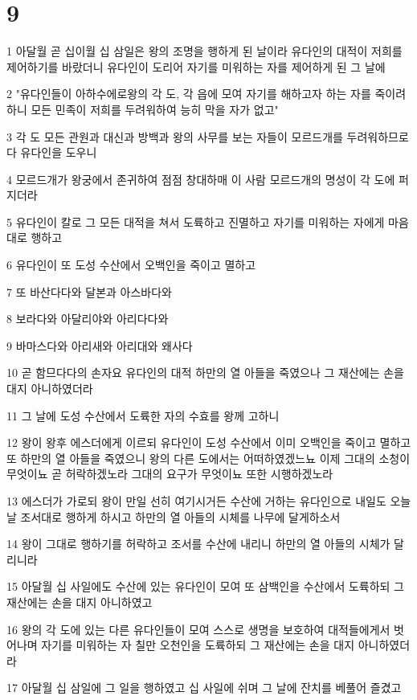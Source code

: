 \chapter{9}

\par 1 아달월 곧 십이월 십 삼일은 왕의 조명을 행하게 된 날이라 유다인의 대적이 저희를 제어하기를 바랐더니 유다인이 도리어 자기를 미워하는 자를 제어하게 된 그 날에
\par 2 "유다인들이 아하수에로왕의 각 도, 각 읍에 모여 자기를 해하고자 하는 자를 죽이려 하니 모든 민족이 저희를 두려워하여 능히 막을 자가 없고"
\par 3 각 도 모든 관원과 대신과 방백과 왕의 사무를 보는 자들이 모르드개를 두려워하므로 다 유다인을 도우니
\par 4 모르드개가 왕궁에서 존귀하여 점점 창대하매 이 사람 모르드개의 명성이 각 도에 퍼지더라
\par 5 유다인이 칼로 그 모든 대적을 쳐서 도륙하고 진멸하고 자기를 미워하는 자에게 마음대로 행하고
\par 6 유다인이 또 도성 수산에서 오백인을 죽이고 멸하고
\par 7 또 바산다다와 달본과 아스바다와
\par 8 보라다와 아달리야와 아리다다와
\par 9 바마스다와 아리새와 아리대와 왜사다
\par 10 곧 함므다다의 손자요 유다인의 대적 하만의 열 아들을 죽였으나 그 재산에는 손을 대지 아니하였더라
\par 11 그 날에 도성 수산에서 도륙한 자의 수효를 왕께 고하니
\par 12 왕이 왕후 에스더에게 이르되 유다인이 도성 수산에서 이미 오백인을 죽이고 멸하고 또 하만의 열 아들을 죽였으니 왕의 다른 도에서는 어떠하였겠느뇨 이제 그대의 소청이 무엇이뇨 곧 허락하겠노라 그대의 요구가 무엇이뇨 또한 시행하겠노라
\par 13 에스더가 가로되 왕이 만일 선히 여기시거든 수산에 거하는 유다인으로 내일도 오늘날 조서대로 행하게 하시고 하만의 열 아들의 시체를 나무에 달게하소서
\par 14 왕이 그대로 행하기를 허락하고 조서를 수산에 내리니 하만의 열 아들의 시체가 달리니라
\par 15 아달월 십 사일에도 수산에 있는 유다인이 모여 또 삼백인을 수산에서 도륙하되 그 재산에는 손을 대지 아니하였고
\par 16 왕의 각 도에 있는 다른 유다인들이 모여 스스로 생명을 보호하여 대적들에게서 벗어나며 자기를 미워하는 자 칠만 오천인을 도륙하되 그 재산에는 손을 대지 아니하였더라
\par 17 아달월 십 삼일에 그 일을 행하였고 십 사일에 쉬며 그 날에 잔치를 베풀어 즐겼고
